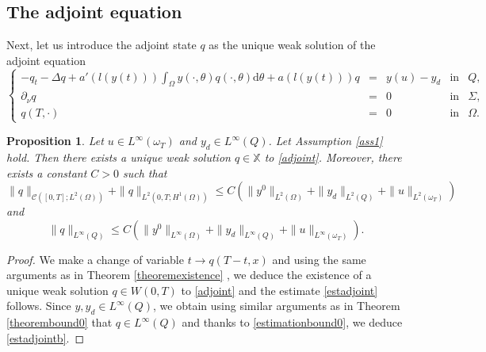 \documentclass[reqno,twoside]{amsart}
\numberwithin{equation}{section}
\newtheorem{proposition}[theorem]{Proposition}
\theoremstyle{definition}
\numberwithin{equation}{section}
\def \dis {\displaystyle}
\def \X {\mathbb{X}}
\def \C {\mathcal{C}}
\def \C {{\mathcal C}}
\def \d {\mathrm{d}}
\def \X {\mathbb{X}}
\def \C {\mathcal{C}}
\def \X {\mathbb{ X}}
\def \C {{\mathcal C}}
\begin{document}
\subsection{The adjoint equation}
Next, let us introduce the adjoint state $q$ as the unique weak solution of the adjoint equation
\begin{equation}\label{adjoint}
\left\{
\begin{array}{rllll}
	\dis -q_t-\Delta q+a'(l(y(t)))\int_{\Omega}y(\cdot,\theta)q(\cdot,\theta)\d \theta+a(l(y(t)))q &=& y(u)-y_d &\mbox{in}& Q,\\
	\dis \partial_{\nu}q&=&0  &\mbox{in}& \Sigma,\\
	q(T,\cdot)&=& 0&\mbox{in}& \Omega.
\end{array}
\right.
\end{equation}
\begin{proposition}\label{existenceadjoint}
Let $u\in L^\infty(\omega_T)$ and $y_d\in L^\infty(Q)$. Let Assumption \ref{ass1} hold. Then there exists a unique weak solution $q\in \X$ to \eqref{adjoint}. Moreover, there exists a constant $C>0$ such that
\begin{equation}\label{estadjoint}
	\|q\|_{\C([0,T];L^2(\Omega))}+ \|q\|_{L^2(0,T;H^1(\Omega))} \leq C\left(\|y^0\|_{L^2(\Omega)}+\|y_d\|_{L^2(Q)}+\|u\|_{L^2(\omega_T)}\right)
\end{equation}
and
\begin{equation}\label{estadjointb}
	\|q\|_{L^\infty(Q)}\leq C\left(\|y^0\|_{L^\infty(\Omega)}+\|y_d\|_{L^\infty(Q)}+\|u\|_{L^\infty(\omega_T)}\right).
\end{equation}
\end{proposition}
\begin{proof} We make a change of variable $t\to q(T-t,x)$ and using the same arguments as in Theorem \ref{theoremexistence} , we deduce the existence of a unique weak solution $q\in W(0,T)$ to \eqref{adjoint} and the estimate \eqref{estadjoint} follows. Since $y,y_d\in L^\infty(Q)$, we obtain using similar arguments as in Theorem \ref{theorembound0} that $q\in L^\infty(Q)$ and thanks to \eqref{estimationbound0}, we deduce \eqref{estadjointb}.	
\end{proof}
\end{document}
